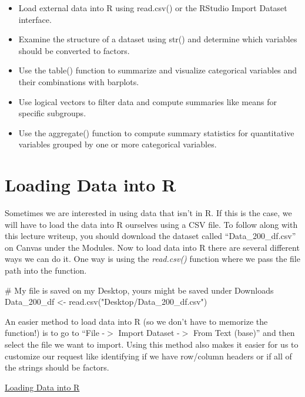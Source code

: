 \documentclass[
  letterpaper,
  DIV=11,
  numbers=noendperiod]{scrreprt}
\newenvironment{Shaded}{\begin{snugshade}}{\end{snugshade}}
\newcommand{\CommentTok}[1]{\textcolor[rgb]{0.37,0.37,0.37}{#1}}
\newcommand{\FunctionTok}[1]{\textcolor[rgb]{0.28,0.35,0.67}{#1}}
\newcommand{\NormalTok}[1]{\textcolor[rgb]{0.00,0.23,0.31}{#1}}
\newcommand{\OtherTok}[1]{\textcolor[rgb]{0.00,0.23,0.31}{#1}}
\newcommand{\StringTok}[1]{\textcolor[rgb]{0.13,0.47,0.30}{#1}}
\providecommand{\tightlist}{%
  \setlength{\itemsep}{0pt}\setlength{\parskip}{0pt}}
\begin{document}
\begin{itemize}
\tightlist
\item
  Load external data into R using read.csv() or the RStudio Import
  Dataset interface.
\item
  Examine the structure of a dataset using str() and determine which
  variables should be converted to factors.
\item
  Use the table() function to summarize and visualize categorical
  variables and their combinations with barplots.
\item
  Use logical vectors to filter data and compute summaries like means
  for specific subgroups.
\item
  Use the aggregate() function to compute summary statistics for
  quantitative variables grouped by one or more categorical variables.
\end{itemize}

\section{Loading Data into R}\label{loading-data-into-r}

Sometimes we are interested in using data that isn't in R. If this is
the case, we will have to load the data into R ourselves using a CSV
file. To follow along with this lecture writeup, you should download the
dataset called ``Data\_200\_df.csv'' on Canvas under the Modules. Now to
load data into R there are several different ways we can do it. One way
is using the \emph{read.csv()} function where we pass the file path into
the function.

\begin{Shaded}
\begin{Highlighting}[]
\CommentTok{\# My file is saved on my Desktop, yours might be saved under Downloads}
\NormalTok{Data\_200\_df }\OtherTok{\textless{}{-}} \FunctionTok{read.csv}\NormalTok{(}\StringTok{"Desktop/Data\_200\_df.csv"}\NormalTok{)}
\end{Highlighting}
\end{Shaded}

An easier method to load data into R (so we don't have to memorize the
function!) is to go to ``File -\(>\) Import Dataset -\(>\) From Text
(base)'' and then select the file we want to import. Using this method
also makes it easier for us to customize our request like identifying if
we have row/column headers or if all of the strings should be factors.

\begin{watch}{}{}
    \href{https://youtu.be/603gU61EWQ4}{Loading Data into R}
\end{watch}
\end{document}

